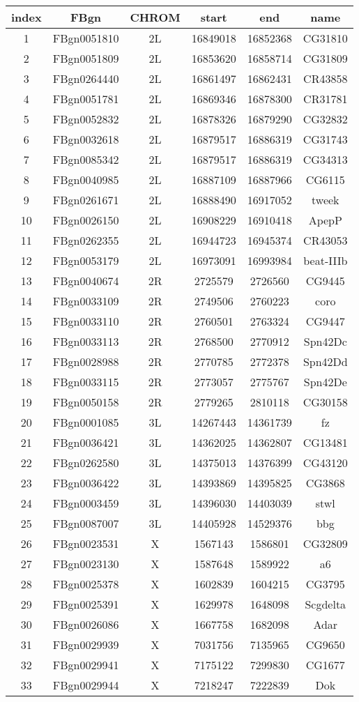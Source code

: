 \centering \begin{tabular}{c|c|c|c|c|c}
index	&FBgn	&CHROM	&start	&end	&name\\\hline
1	&FBgn0051810	&2L	&16849018	&16852368	&CG31810\\
2	&FBgn0051809	&2L	&16853620	&16858714	&CG31809\\
3	&FBgn0264440	&2L	&16861497	&16862431	&CR43858\\
4	&FBgn0051781	&2L	&16869346	&16878300	&CR31781\\
5	&FBgn0052832	&2L	&16878326	&16879290	&CG32832\\
6	&FBgn0032618	&2L	&16879517	&16886319	&CG31743\\
7	&FBgn0085342	&2L	&16879517	&16886319	&CG34313\\
8	&FBgn0040985	&2L	&16887109	&16887966	&CG6115\\
9	&FBgn0261671	&2L	&16888490	&16917052	&tweek\\
10	&FBgn0026150	&2L	&16908229	&16910418	&ApepP\\
11	&FBgn0262355	&2L	&16944723	&16945374	&CR43053\\
12	&FBgn0053179	&2L	&16973091	&16993984	&beat-IIIb\\
13	&FBgn0040674	&2R	&2725579	&2726560	&CG9445\\
14	&FBgn0033109	&2R	&2749506	&2760223	&coro\\
15	&FBgn0033110	&2R	&2760501	&2763324	&CG9447\\
16	&FBgn0033113	&2R	&2768500	&2770912	&Spn42Dc\\
17	&FBgn0028988	&2R	&2770785	&2772378	&Spn42Dd\\
18	&FBgn0033115	&2R	&2773057	&2775767	&Spn42De\\
19	&FBgn0050158	&2R	&2779265	&2810118	&CG30158\\
20	&FBgn0001085	&3L	&14267443	&14361739	&fz\\
21	&FBgn0036421	&3L	&14362025	&14362807	&CG13481\\
22	&FBgn0262580	&3L	&14375013	&14376399	&CG43120\\
23	&FBgn0036422	&3L	&14393869	&14395825	&CG3868\\
24	&FBgn0003459	&3L	&14396030	&14403039	&stwl\\
25	&FBgn0087007	&3L	&14405928	&14529376	&bbg\\
26	&FBgn0023531	&X	&1567143	&1586801	&CG32809\\
27	&FBgn0023130	&X	&1587648	&1589922	&a6\\
28	&FBgn0025378	&X	&1602839	&1604215	&CG3795\\
29	&FBgn0025391	&X	&1629978	&1648098	&Scgdelta\\
30	&FBgn0026086	&X	&1667758	&1682098	&Adar\\
31	&FBgn0029939	&X	&7031756	&7135965	&CG9650\\
32	&FBgn0029941	&X	&7175122	&7299830	&CG1677\\
33	&FBgn0029944	&X	&7218247	&7222839	&Dok\\
\end{tabular}
